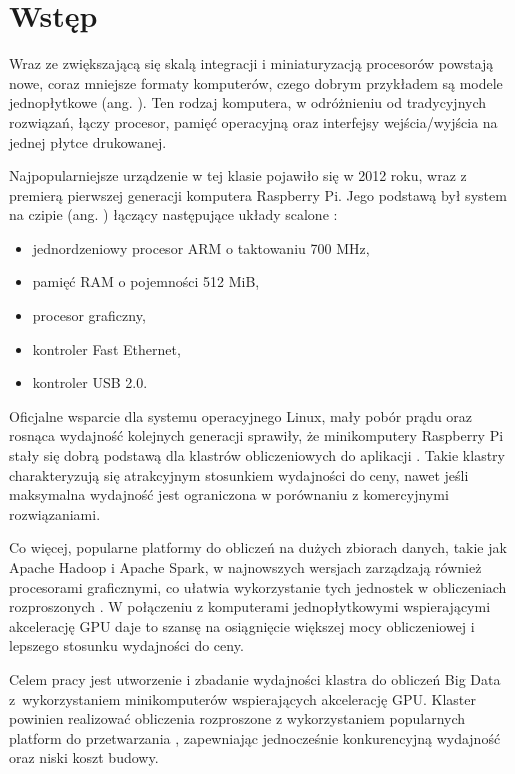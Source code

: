 \chapter{Wstęp}

Wraz ze zwiększającą się skalą integracji i miniaturyzacją procesorów powstają nowe,
coraz mniejsze formaty komputerów, czego dobrym przykładem są modele jednopłytkowe
(ang. ).
Ten rodzaj komputera, w odróżnieniu od tradycyjnych rozwiązań, łączy procesor, pamięć
operacyjną oraz interfejsy wejścia/wyjścia na jednej płytce drukowanej.

Najpopularniejsze urządzenie w tej klasie pojawiło się w 2012 roku, wraz z premierą
pierwszej generacji komputera Raspberry Pi. Jego podstawą był system na czipie (ang.
) łączący następujące układy scalone \cite{rpi-spec}:
\begin{itemize}
    \item jednordzeniowy procesor ARM o taktowaniu 700 MHz,
    \item pamięć RAM o pojemności 512 MiB,
    \item procesor graficzny,
    \item kontroler Fast Ethernet,
    \item kontroler USB 2.0.
\end{itemize}

Oficjalne wsparcie dla systemu operacyjnego Linux, mały pobór prądu oraz rosnąca wydajność
kolejnych generacji sprawiły, że minikomputery Raspberry Pi stały się dobrą podstawą dla
klastrów obliczeniowych do aplikacji  \cite{rpi-cluster-2}. Takie klastry
charakteryzują się atrakcyjnym stosunkiem wydajności do ceny, nawet jeśli maksymalna
wydajność jest ograniczona w porównaniu z komercyjnymi rozwiązaniami.

Co więcej, popularne platformy do obliczeń na dużych zbiorach danych, takie jak Apache Hadoop
i Apache Spark, w najnowszych wersjach zarządzają również procesorami graficznymi, co ułatwia
wykorzystanie tych jednostek w obliczeniach rozproszonych \cite{spark-gpu}. W połączeniu z
komputerami jednopłytkowymi wspierającymi akcelerację GPU daje to szansę na osiągnięcie
większej mocy obliczeniowej i lepszego stosunku wydajności do ceny.

Celem pracy jest utworzenie i zbadanie wydajności klastra do obliczeń Big Data z~wykorzystaniem
minikomputerów wspierających akcelerację GPU. Klaster powinien realizować obliczenia rozproszone
z wykorzystaniem popularnych platform do przetwarzania , zapewniając jednocześnie
konkurencyjną wydajność oraz niski koszt budowy.

